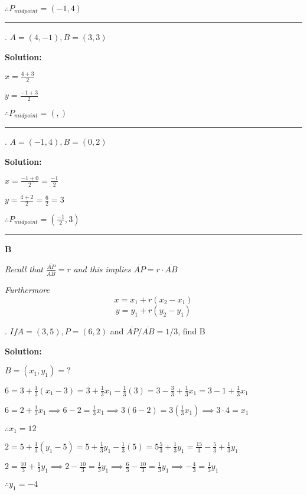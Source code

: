 \documentclass[10pt,letterpaper]{article}
\begin{document}
\smallskip
$\therefore P_{midpoint}=(-1,4)$

\noindent\rule{15cm}{0.4pt}

. $A=(4,-1), B=(3,3)$

\medskip
{} {\textbf{{\color{blue}Solution}:}}

\smallskip
$x=\frac{4+3}{2}$

\smallskip
$y=\frac{-1+3}{2}$

\smallskip
$\therefore P_{midpoint}=(,)$

\noindent\rule{15cm}{0.4pt}

. $A=(-1,4), B=(0,2)$

\medskip
{} {\textbf{{\color{blue}Solution}:}}

\medskip
$x=\frac{-1+0}{2}=\frac{-1}{2}$

\medskip
$y=\frac{4+2}{2}=\frac{6}{2}=3$

\medskip
$\therefore P_{midpoint}=(\frac{-1}{2},3)$

\noindent\rule{15cm}{0.4pt}

\pagebreak
\textbf{B}

\medskip
\textit{Recall that $\frac{\overline{AP}}{\overline{AB}} = r$}
\textit{and this implies $\overline{AP} = r\cdot\overline{AB}$}

\medskip
\textit{Furthermore }
\[x=x_1+r(x_2-x_1)\]
\[y=y_1+r(y_2-y_1)\]

\medskip

. $If A=(3,5), P=(6,2)$ and $\overline{AP}/\overline{AB}=1/3$, find B

\medskip
{} {\textbf{{\color{blue}Solution}:}}

\medskip
$B=(x_1,y_1)=?$

\medskip
$6=3+\frac{1}{3}(x_1-3)=3+\frac{1}{3}x_1-\frac{1}{3}(3)=3-\frac{3}{3}+\frac{1}{3}x_1=3-1+\frac{1}{3}x_1$

\medskip
$6=2+\frac{1}{3}x_1\implies6-2=\frac{1}{3}x_1\implies3(6-2)=3(\frac{1}{3}x_1)\implies3\cdot4=x_1$

\medskip
$\therefore x_1=12$

\medskip
$2=5+\frac{1}{3}(y_1-5)=5+\frac{1}{3}y_1-\frac{1}{3}(5)=5\frac{5}{3}+\frac{1}{3}y_1=\frac{15}{3}-\frac{5}{3}+\frac{1}{3}y_1$

\medskip
$2=\frac{10}{3}+\frac{1}{3}y_1 \implies 2-\frac{10}{3}=\frac{1}{3}y_1 \implies \frac{6}{3}-\frac{10}{3}=\frac{1}{3}y_1 \implies -\frac{4}{3}=\frac{1}{3}y_1$

\medskip
$\therefore y_1=-4$
\end{document}
